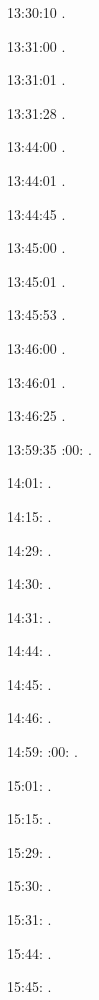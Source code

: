 \documentclass[italian]{article}
\begin{document}
13:30:10     .

13:31:00     .

13:31:01     .

13:31:28     .

13:44:00     .

13:44:01     .

13:44:45     .

13:45:00     .

13:45:01     .

13:45:53     .

13:46:00     .

13:46:01     .

13:46:25     .

13:59:35     
:00:    .

14:01:     . 

14:15:     . 

14:29:     . 

14:30:     .

14:31:     .

14:44:     .

14:45:     .

14:46:     .

14:59:     
:00:    .

15:01:     . 

15:15:     . 

15:29:     . 

15:30:     .

15:31:     .

15:44:     .

15:45:     .
\end{document}
